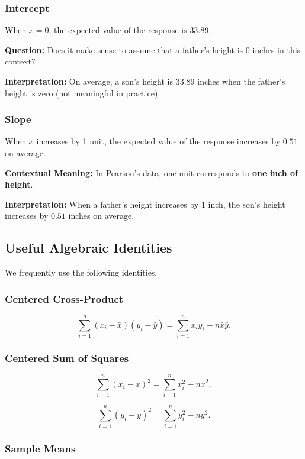 \subsubsection*{Intercept}

When $x = 0$, the expected value of the response is $33.89$.

\textbf{Question:} Does it make sense to assume that a father's height is $0$ inches in this context?

\textbf{Interpretation:}
On average, a son's height is $33.89$ inches when the father's height is zero (not meaningful in practice).

\subsubsection*{Slope}

When $x$ increases by 1 unit, the expected value of the response increases by $0.51$ on average.

\textbf{Contextual Meaning:}
In Pearson's data, one unit corresponds to \textbf{one inch of height}.

\textbf{Interpretation:}
When a father's height increases by 1 inch, the son's height increases by $0.51$ inches on average.

\subsection{Useful Algebraic Identities}

We frequently use the following identities.

\subsubsection*{Centered Cross-Product}

\[
\sum_{i=1}^n (x_i - \bar{x})(y_i - \bar{y})
=
\sum_{i=1}^n x_i y_i - n \bar{x}\bar{y}.
\]

\subsubsection*{Centered Sum of Squares}

\[
\sum_{i=1}^n (x_i - \bar{x})^2
=
\sum_{i=1}^n x_i^2 - n \bar{x}^2,
\]

\[
\sum_{i=1}^n (y_i - \bar{y})^2
=
\sum_{i=1}^n y_i^2 - n \bar{y}^2.
\]

\subsubsection*{Sample Means}


